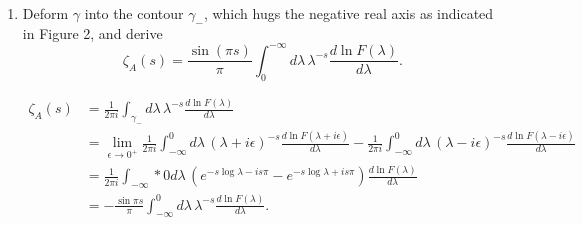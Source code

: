 \begin{enumerate}[label=\alph*)]
    \item Deform $\gamma$ into the contour $\gamma_-$, which hugs the negative
    real axis as indicated in Figure 2, and derive
    \begin{equation}
        \zeta_A(s)
        =\frac{\sin(\pi s)}{\pi}
        \int_0^{-\infty}d\lambda\,
        \lambda^{-s}
        \frac{d\ln F(\lambda)}{d\lambda}.
    \end{equation}
    \begin{solution}
        \begin{equation}
        \begin{aligned}
                        \zeta_A(s) &= \frac{1}{2\pi i}
        \int_{\gamma_-} d\lambda\,
        \lambda^{-s}
        \frac{d\ln F(\lambda)}{d\lambda}\\ &= \lim_{\epsilon \to 0^+}\frac{1}{2\pi i}
        \int_{-\infty}^0 d\lambda\,
        (\lambda+i\epsilon)^{-s}
        \frac{d\ln F(\lambda+i\epsilon)}{d\lambda} -  \frac{1}{2\pi i}
        \int_{-\infty}^0 d\lambda\,
        (\lambda-i\epsilon)^{-s}
        \frac{d\ln F(\lambda-i\epsilon)}{d\lambda}\\
        &=\frac{1}{2\pi i}
        \int_{-\infty}*0 d\lambda\,
        (e^{-s\log \lambda-is\pi}-e^{-s\log \lambda+ is\pi})
        \frac{d\ln F(\lambda)}{d\lambda}\\
        &=-\frac{\sin \pi s}{\pi}\int_{-\infty}^0 d\lambda\,
        \lambda^{-s}
        \frac{d\ln F(\lambda)}{d\lambda}.
        \end{aligned}
        \end{equation}
    \end{solution}



\end{enumerate}
